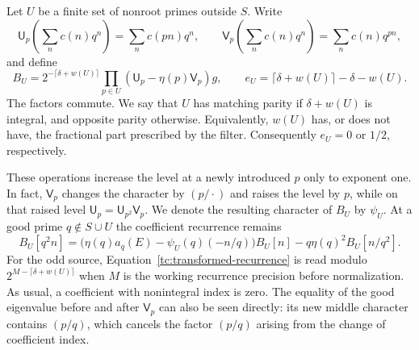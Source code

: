 Let $U$ be a finite set of nonroot primes outside $S$.  Write
\[
 \mathsf U_p\!\left(\sum_n c(n)q^n\right)=\sum_n c(pn)q^n,
 \qquad
 \mathsf V_p\!\left(\sum_n c(n)q^n\right)=\sum_n c(n)q^{pn},
\]
and define
\begin{equation}
 B_U=2^{-\lceil\delta+w(U)\rceil}
             \prod_{p\in U}(\mathsf U_p-\eta(p)\mathsf V_p)g,
 \qquad
 e_U=\lceil\delta+w(U)\rceil-\delta-w(U).
 \label{tc:normalized-operator}
\end{equation}
The factors commute.  We say that $U$ has matching parity if
$\delta+w(U)$ is integral, and opposite parity otherwise.  Equivalently,
$w(U)$ has, or does not have, the fractional part prescribed by the filter.
Consequently $e_U=0$ or $1/2$, respectively.

These operations increase the level at a newly introduced $p$ only to
exponent one.  In fact, $\mathsf V_p$ changes the character by
$(p/\cdot)$ and raises the level by $p$, while on that raised level
$\mathsf U_p=\mathsf U_{p^2}\mathsf V_p$.  We denote the resulting
character of $B_U$ by $\psi_U$.  At a good prime $q\notin S\cup U$ the
coefficient recurrence remains
\begin{equation}
 B_U[q^2n]
 =\bigl(\eta(q)a_q(E)-\psi_U(q)(-n/q)\bigr)B_U[n]
       -q\eta(q)^2B_U[n/q^2].
 \label{tc:transformed-recurrence}
\end{equation}
For the odd source, Equation~\eqref{tc:transformed-recurrence} is read
modulo $2^{M-\lceil\delta+w(U)\rceil}$ when $M$ is the working
recurrence precision before normalization. As usual, a coefficient with
nonintegral index is zero. The equality of
the good eigenvalue before and after $\mathsf V_p$ can also be seen
directly: its new middle character contains $(p/q)$, which cancels the
factor $(p/q)$ arising from the change of coefficient index.

